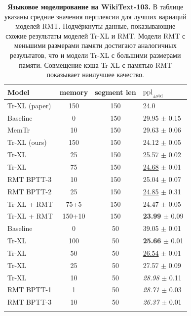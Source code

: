 \begin{table}%
\centering
\fontsize{7}{8}
\selectfont 
\begin{tabular}{lccl}
\toprule
Model          & memory & segment len & $\text{ppl}_{\pm \text{std}}$ \\
\midrule
Tr-XL (paper)   &  150         &  150        & 24.0  \\
\midrule
Baseline        &  0           &  150          & 29.95 \tiny{$\pm$ 0.15} \\
MemTr           &  10          &  150         & 29.63 \tiny $\pm$ 0.06 \\
Tr-XL (ours)    &  150         &  150        & 24.12 \tiny $\pm$ 0.05 \\
\midrule
Tr-XL           &  25          &  150         & 25.57 \tiny $\pm$ 0.02 \\
Tr-XL           &  75          &  150         & \underline{24.68} \tiny $\pm$ 0.01 \\
RMT BPTT-3      &  10          &  150         & 25.04 \tiny $\pm$ 0.07 \\
RMT BPTT-2      &  25          &  150         & \underline{24.85} \tiny $\pm$ 0.31 \\
Tr-XL + RMT
&75+5 &  150        &  24.47 \tiny $\pm$ 0.05 \\
Tr-XL + RMT
&150+10&  150        & \textbf{23.99} \tiny $\pm$ 0.09 \\
\midrule
Baseline        &   0          &  50          & 39.05 \tiny $\pm$ 0.01 \\
Tr-XL           &   100         &  50         & \textbf{25.66} \tiny $\pm$ 0.01 \\
Tr-XL           &   50         &  50         & \underline{26.54} \tiny $\pm$ 0.01 \\
Tr-XL           &   25         &  50         & 27.57 \tiny $\pm$ 0.09\\
Tr-XL           &   10         &  50         & \textit{28.98} \tiny $\pm$ 0.11 \\
RMT BPTT-1      &   1          &  50          & \textit{28.71} \tiny $\pm$ 0.03 \\
RMT BPTT-3      &   10          &  50          & \textit{26.37} \tiny $\pm$ 0.01\\
\bottomrule
\label{tab:wt103}
\end{tabular}
\caption{\textbf{Языковое моделирование на WikiText-103.} В таблице указаны средние значения перплексии для лучших вариаций моделей RMT. Подчёркнуты данные, показывающие схожие результаты моделей Tr-XL и RMT. Модели RMT с меньшими размерами памяти достигают аналогичных результатов, что и модели Tr-XL с большими размерами памяти. Совмещение кэша Tr-XL с памятью RMT показывает наилучшее качество.}
\end{table}



